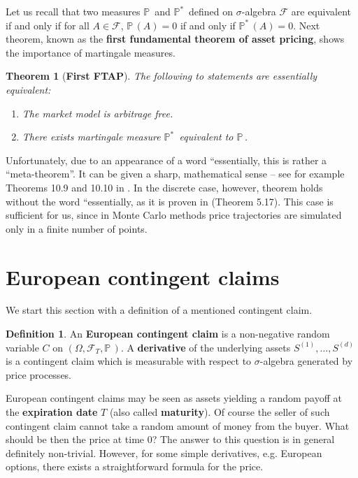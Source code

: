 \documentclass[a4paper,11pt, twoside]{book}
\newtheorem{thm}{Theorem}[chapter]
\theoremstyle{definition}
\newtheorem{mydef}{Definition}[chapter]
\theoremstyle{remark}
\newcounter{example}[chapter]
\def\P{{\mathbb{P}}\,}
\def\Pm{{\mathbb{P}}^*\,}
\begin{document}
Let us recall that two measures $\P$ and $\Pm$ defined on $\sigma$-algebra $\mathcal{F}$ are equivalent if and only if for all $A \in \mathcal{F}$, $\P(A)=0$ if and only if $\Pm(A)=0$. Next theorem, known as the \textbf{first fundamental theorem of asset pricing}, shows the importance of martingale measures.
\begin{thm}[\bfseries First FTAP]
 \label{thm:fftap}
 The following to statements are \emph{essentially} equivalent:
 \begin{enumerate}
  \item The market model is arbitrage free.
  \item There exists martingale measure $\Pm$ equivalent to $\P$.
 \end{enumerate}
\end{thm}
Unfortunately, due to an appearance of a word ``essentially, this is rather a ``meta-theorem''. It can be given a sharp, mathematical sense -- see for example Theorems 10.9 and 10.10 in \cite{bjork}. In the discrete case, however, theorem holds without the word ``essentially, as it is proven in \cite{follmer} (Theorem 5.17). This case is sufficient for us, since in Monte Carlo methods price trajectories are simulated only in a finite number of points.

\section{European contingent claims}
\label{sec:ECC}
We start this section with a definition of a mentioned contingent claim.
\begin{mydef}
 \label{def:cc_eu}
 An \textbf{European contingent claim} is a non-negative random variable $C$ on $(\Omega, \mathcal{F}_T, \P)$. A \textbf{derivative} of the underlying assets $S^{(1)}, \ldots, S^{(d)}$ is a contingent claim which is measurable with respect to $\sigma$-algebra generated by price processes.
\end{mydef}
European contingent claims may be seen as assets yielding a random payoff at the \textbf{expiration date} $T$ (also called \textbf{maturity}). Of course the seller of such contingent claim cannot take a random amount of money from the buyer. What should be then the price at time $0$? The answer to this question is in general definitely non-trivial. However, for some simple derivatives, e.g. European options, there exists a straightforward formula for the price.
\end{document}
